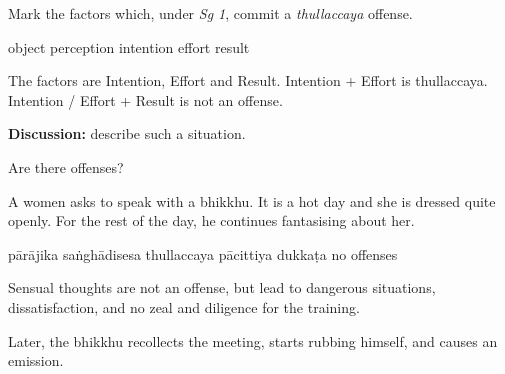 \begin{exam}{\autoExamName}
\problemDivide

\begin{problem}

  Mark the factors which, under \textit{Sg 1}, commit a \textit{thullaccaya} offense.

  \begin{answers}{6}
    \bChoices
     object\eAns
     perception\eAns
     intention\eAns
     effort\eAns
     result\eAns
    \eChoices
  \end{answers}

  \bigskip

  \begin{solution}
    The factors are Intention, Effort and Result. Intention + Effort is
    thullaccaya. Intention / Effort + Result is not an offense.
  \end{solution}

  \textbf{Discussion:} describe such a situation.

\end{problem}

\problemDivide

\begin{problem*}

  Are there offenses?

\begin{parts}

\item
  A women asks to speak with a bhikkhu.
  It is a hot day and she is dressed quite openly.
  For the rest of the day, he continues fantasising about her.

  \bigskip

  \begin{answers}{6}
    \bChoices
     pārājika\eAns
     saṅghādisesa\eAns
     thullaccaya\eAns
     pācittiya\eAns
     dukkaṭa\eAns
     no offenses\eAns
    \eChoices
  \end{answers}

  \begin{solution}
    Sensual thoughts are not an offense, but lead to dangerous situations,
    dissatisfaction, and no zeal and diligence for the training.
  \end{solution}

  \bigskip

  \item Later, the bhikkhu recollects the meeting, starts rubbing himself, and causes an emission.

  \bigskip


\end{parts}
\end{problem*}
\end{exam}
